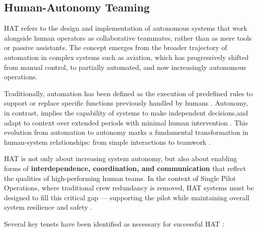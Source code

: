 \documentclass[12pt,a4paper]{article} %
\begin{document}
	\subsection{Human-Autonomy Teaming}

	HAT refers to the design and implementation of autonomous systems that work alongside human operators as collaborative teammates, rather than as mere tools or passive assistants. The concept emerges from the broader trajectory of automation in complex systems such as aviation, which has progressively shifted from manual control, to partially automated, and now increasingly autonomous operations.

	Traditionally, automation has been defined as the execution of predefined rules to support or replace specific functions previously handled by humans \parencite{parasuraman_model_2000,hancock_imposing_2017,hoff_trust_2015}. Autonomy, in contrast, implies the capability of systems to make independent decisions,and adapt to context over extended periods with minimal human intervention \parencite{endsley_here_2017-1,holbrook_enabling_2020}. This evolution from automation to autonomy marks a fundamental transformation in human-system relationships: from simple interactions to teamwork \parencite{endsley_here_2017-1}.

	HAT is not only about increasing system autonomy, but also about enabling forms of \textbf{interdependence, coordination, and communication} that reflect the qualities of high-performing human teams. In the context of Single Pilot Operations, where traditional crew redundancy is removed, HAT systems must be designed to fill this critical gap — supporting the pilot while maintaining overall system resilience and safety \parencite{mcneese_chapter_2020}.

	Several key tenets have been identified as necessary for successful HAT \parencite{wynne_integrative_2018}:
\end{document}
